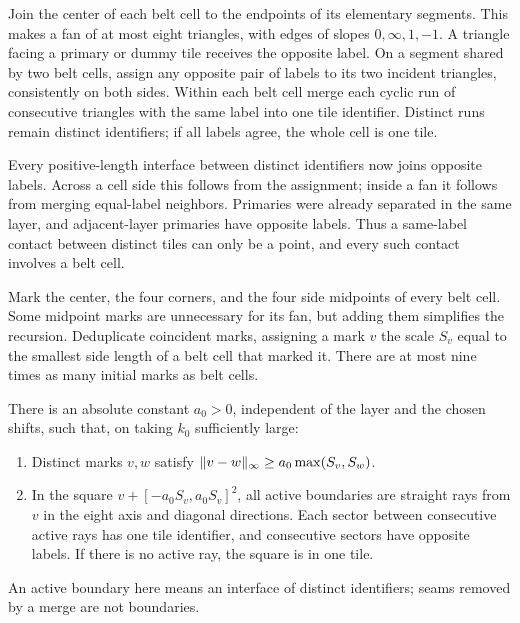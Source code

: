 Join the center of each belt cell to the endpoints of its elementary
segments.  This makes a fan of at most eight triangles, with edges of
slopes $0,\infty,1,-1$.  A triangle facing a primary or dummy tile receives
the opposite label.  On a segment shared by two belt cells, assign any
opposite pair of labels to its two incident triangles, consistently on
both sides.  Within each belt cell merge each cyclic run of consecutive
triangles with the same label into one tile identifier.  Distinct runs
remain distinct identifiers; if all labels agree, the whole cell is one
tile.

Every positive-length interface between distinct identifiers now joins
opposite labels.  Across a cell side this follows from the assignment;
inside a fan it follows from merging equal-label neighbors.  Primaries
were already separated in the same layer, and adjacent-layer primaries
have opposite labels.  Thus a same-label contact between distinct tiles
can only be a point, and every such contact involves a belt cell.

Mark the center, the four corners, and the four side midpoints of every
belt cell.  Some midpoint marks are unnecessary for its fan, but adding
them simplifies the recursion.  Deduplicate coincident marks, assigning
a mark $v$ the scale $S_v$ equal to the smallest side length of a belt
cell that marked it.  There are at most nine times as many initial marks
as belt cells.

\begin{lemma}
\label{geometry:initial-stars}
There is an absolute constant $a_0>0$, independent of the layer and the
chosen shifts, such that, on taking $k_0$ sufficiently large:
\begin{enumerate}
\item
Distinct marks $v,w$ satisfy
$\lVert v-w\rVert_\infty\ge a_0\max(S_v,S_w)$.
\item
In the square $v+[-a_0S_v,a_0S_v]^2$, all active boundaries are straight
rays from $v$ in the eight axis and diagonal directions.  Each sector
between consecutive active rays has one tile identifier, and consecutive
sectors have opposite labels.  If there is no active ray, the square is
in one tile.
\end{enumerate}
An active boundary here means an interface of distinct identifiers;
seams removed by a merge are not boundaries.
\end{lemma}

